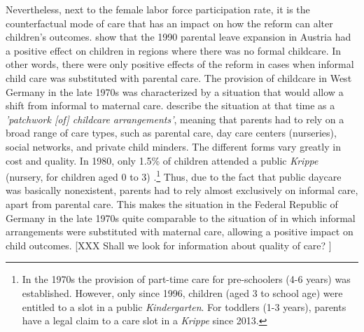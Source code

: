 \documentclass[11pt, a4paper,draft]{article} %
\begin{document}
Nevertheless, next to the female labor force participation rate, it is the counterfactual mode of care that has an impact on how the reform can alter children's outcomes. \cite{danzer2017parental} show that the 1990 parental leave expansion in Austria had a positive effect on children in regions where there was no formal childcare. In other words, there were only positive effects of the reform in cases when informal child care was substituted with parental care. The provision of childcare in West Germany in the late 1970s was characterized by a situation that would allow a shift from informal to maternal care. \cite{hank2001childcare} describe the situation at that time as a \textit{'patchwork [of] childcare arrangements'}, meaning that parents had to rely on a broad range of care types, such as parental care, day care centers (nurseries), social networks, and private child minders. The different forms vary greatly in cost and quality. In 1980, only 1.5\% of children attended a public \textit{Krippe} (nursery, for children aged 0 to 3) \citep[p.~34]{bildungsbericht2006}.\footnote{In the 1970s the provision of part-time care for pre-schoolers (4-6 years) was established. However, only since 1996, children (aged 3 to school age) were entitled to a slot in a public \textit{Kindergarten}. For toddlers (1-3 years), parents have a legal claim to a care slot in a \textit{Krippe} since 2013.} Thus, due to the fact that public daycare was basically nonexistent, parents had to rely almost exclusively on informal care, apart from parental care. This makes the situation in the Federal Republic of Germany in the late 1970s quite comparable to the situation of \cite{danzer2017parental} in which informal arrangements were substituted with maternal care, allowing a positive impact on child outcomes.
[XXX Shall we look for information about quality of care? ]



\bigskip
\end{document}
